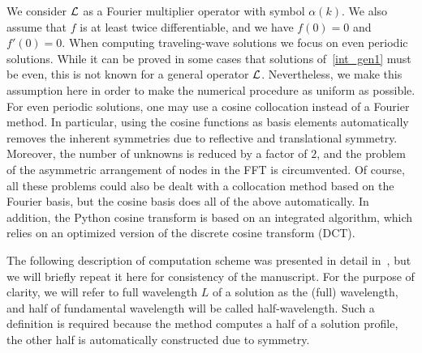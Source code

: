 We consider $\mathcal{L}$ as a Fourier multiplier operator with symbol
$\alpha(k)$. We also assume that $f$ is at least twice differentiable,
and we have $f(0)=0$ and $f'(0)=0$.
When computing traveling-wave solutions we focus on even periodic solutions. 
While it can be proved in some cases that solutions of~\eqref{int_gen1}
must be even, this is not known for a general operator $\mathcal{L}$.
Nevertheless, we make this assumption here in order to
make the numerical procedure as uniform as possible.
For even periodic solutions, 
one may use a cosine collocation instead of a Fourier method. In particular, using
the cosine functions as basis elements automatically removes the inherent symmetries
due to reflective and translational symmetry. 
Moreover, the number of unknowns is reduced by a factor of $2$, 
and the problem of the asymmetric arrangement of nodes in the FFT
is circumvented. Of course, all these problems could also be dealt with a collocation
method based on the Fourier basis, but the cosine basis does all of the above automatically.
In addition,  the \textsf{Python} cosine transform is based on an integrated algorithm, which
relies on an optimized version of the discrete cosine transform (DCT).
	
The following description of computation scheme was presented in detail in~\cite{EK2}, 
but we will briefly repeat it here for consistency of the manuscript. For the purpose of clarity, 
we will refer to full wavelength $L$ of a solution as the (full) wavelength, 
and half of fundamental wavelength will be called half-wavelength. 
Such a definition is required because the method computes a half of a solution profile, 
the other half is automatically constructed due to symmetry.
 
